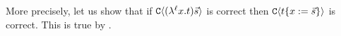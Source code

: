   More precisely, let us show that
  if $\mathtt{C}\langle(\lambda^{\ell} x. t)\vec{s}\rangle$ is correct
  then $\mathtt{C}\langle t\{x := \vec{s}\}\rangle$ is correct.
  This is true by .
%
